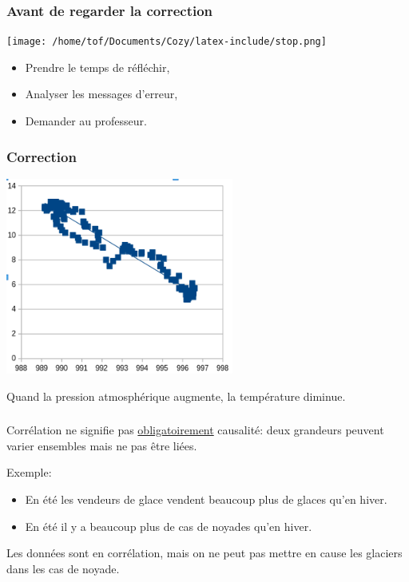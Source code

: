 \documentclass[svgnames,11pt]{beamer}
\begin{document}
\begin{frame}
    \frametitle{Avant de regarder la correction}
\begin{center}
    \centering
    \texttt{[image: /home/tof/Documents/Cozy/latex-include/stop.png]}
    \end{center}
{\Large
    \begin{itemize}
        \item Prendre le temps de réfléchir,
        \item Analyser les messages d'erreur,
        \item Demander au professeur.
    \end{itemize}
}
\end{frame}
\begin{frame}
    \frametitle{Correction}

    \begin{center}
    \centering
    \includegraphics[width=7.5cm]{ressources/temp-press.png}
    \label{IMG}
    \end{center}
Quand la pression atmosphérique augmente, la température diminue.
\end{frame}
\begin{frame}
    \frametitle{}

    \begin{aretenir}[]
    Corrélation ne signifie pas \underline{obligatoirement} causalité: deux grandeurs peuvent varier ensembles mais ne pas être liées.
    \end{aretenir}
Exemple:
\begin{itemize}
    \item En été les vendeurs de glace vendent beaucoup plus de glaces qu'en hiver.
    \item En été il y a beaucoup plus de cas de noyades qu'en hiver.
\end{itemize}
Les données sont en corrélation, mais on ne peut pas mettre en cause les glaciers dans les cas de noyade.
\end{frame}
\end{document}
